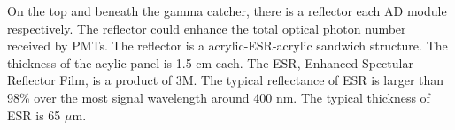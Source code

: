 On the top and beneath the gamma catcher, there is a reflector each AD module respectively.
The reflector could enhance the total optical photon number received by PMTs.
The reflector is a acrylic-ESR-acrylic sandwich structure. The thickness of the acylic panel is 1.5 cm each.
The ESR, Enhanced Spectular Reflector Film, is a product of 3M.
The typical reflectance of ESR is larger than 98\% over the most signal wavelength around 400 nm.
The typical thickness of ESR is 65 $\mu$m.


